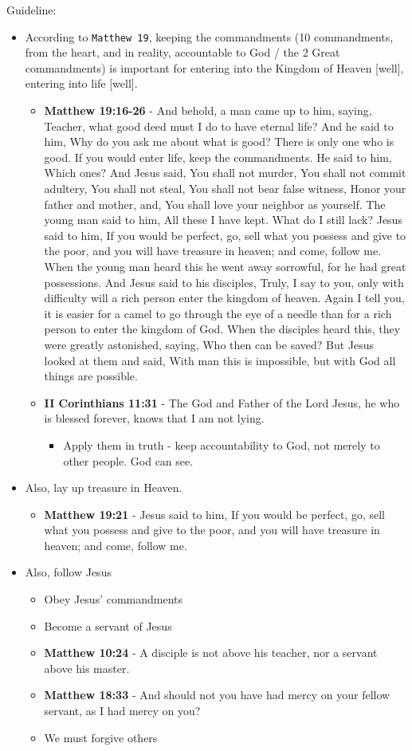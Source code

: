 \documentclass[11pt]{article}
\begin{document}
Guideline:
\begin{itemize}
\item According to \texttt{Matthew 19}, keeping the commandments (10 commandments, from the heart, and in reality, accountable to God / the 2 Great commandments) is important for entering into the Kingdom of Heaven [well], entering into life [well].
\begin{itemize}
\item \textbf{Matthew 19:16-26} - And behold, a man came up to him, saying, Teacher, what good deed must I do to have eternal life? And he said to him, Why do you ask me about what is good? There is only one who is good. If you would enter life, keep the commandments. He said to him, Which ones? And Jesus said, You shall not murder, You shall not commit adultery, You shall not steal, You shall not bear false witness, Honor your father and mother, and, You shall love your neighbor as yourself. The young man said to him, All these I have kept. What do I still lack? Jesus said to him, If you would be perfect, go, sell what you possess and give to the poor, and you will have treasure in heaven; and come, follow me. When the young man heard this he went away sorrowful, for he had great possessions. And Jesus said to his disciples, Truly, I say to you, only with difficulty will a rich person enter the kingdom of heaven. Again I tell you, it is easier for a camel to go through the eye of a needle than for a rich person to enter the kingdom of God. When the disciples heard this, they were greatly astonished, saying, Who then can be saved? But Jesus looked at them and said, With man this is impossible, but with God all things are possible.
\item \textbf{II Corinthians 11:31} - The God and Father of the Lord Jesus, he who is blessed forever, knows that I am not lying.
\begin{itemize}
\item Apply them in truth - keep accountability to God, not merely to other people. God can see.
\end{itemize}
\end{itemize}
\item Also, lay up treasure in Heaven.
\begin{itemize}
\item \textbf{Matthew 19:21} - Jesus said to him, If you would be perfect, go, sell what you possess and give to the poor, and you will have treasure in heaven; and come, follow me.
\end{itemize}
\item Also, follow Jesus
\begin{itemize}
\item Obey Jesus' commandments
\item Become a servant of Jesus
\item \textbf{Matthew 10:24} - A disciple is not above his teacher, nor a servant above his master.
\item \textbf{Matthew 18:33} - And should not you have had mercy on your fellow servant, as I had mercy on you?
\item We must forgive others
\end{itemize}
\end{itemize}
\end{document}
